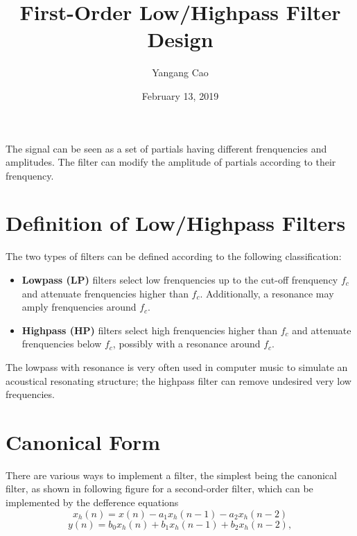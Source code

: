 \documentclass[10pt,a4paper,oneside]{article}
\author{Yangang Cao}
\date{February 13, 2019}
\begin{document}
\title{First-Order Low/Highpass Filter Design}
\maketitle 

The signal can be seen as a set of partials having different frenquencies and amplitudes. The filter can modify the amplitude of partials according to their frenquency.

\section{Definition of Low/Highpass Filters}

The two types of filters can be defined according to the following classification:

\begin{itemize}
	\item {\bfseries Lowpass (LP)} filters select low frenquencies up to the cut-off frenquency $f_c$ and attenuate frenquencies higher than $f_c$. Additionally, a resonance may amply frenquencies around $f_c$.
	\item {\bfseries Highpass (HP)} filters select high frenquencies higher than $f_c$ and attenuate frenquencies below $f_c$, possibly with a resonance around $f_c$.
\end{itemize}

The lowpass with resonance is very often used in computer music to simulate an acoustical resonating structure; the highpass filter can remove undesired very low frequencies.

\section{Canonical Form}
There are various ways to implement a filter, the simplest being the canonical filter, as shown in following figure for a second-order filter, which can be implemented by the defference equations
\[
x_h(n) = x(n) - a_1x_h(n-1) - a_2x_h(n-2)
\]
\[
y(n) = b_0x_h(n) + b_1x_h(n-1) + b_2x_h(n-2),
\]
\end{document}
